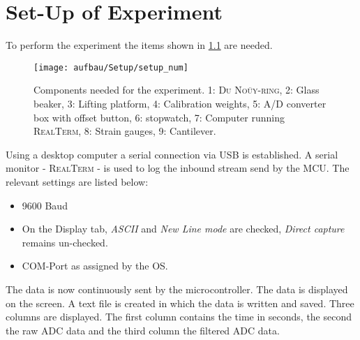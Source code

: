 \chapter{Set-Up of Experiment}
To perform the experiment the items shown in \cref{fig:setup} are needed.
 \begin{figure}[H]
	\centering
	\texttt{[image: aufbau/Setup/setup\_num]}
	\caption[Components needed for the experiment]{Components needed for the experiment. 1: \textsc{Du Noüy-ring}, 2: Glass beaker, 3: Lifting platform, 4: Calibration weights, 5: A/D converter box with offset button, 6: stopwatch, 7: Computer running \textsc{RealTerm}, 8: Strain gauges, 9: Cantilever.}
	\label{fig:setup}
\end{figure}

Using a desktop computer a serial connection via USB is established. A serial monitor - \textsc{RealTerm} - is used to
log the inbound stream send by the MCU. The relevant settings are listed below:
\begin{itemize}
	\item 9600 Baud
	\item On the Display tab, \textit{ASCII} and \textit{New Line mode} are checked, \textit{Direct capture} remains
	un-checked.
	\item COM-Port as assigned by the OS.
\end{itemize}
The data is now continuously sent by the microcontroller. The data is displayed on the screen. A text file is created in
which the data is written and saved. Three columns are displayed. The first column contains the time in seconds, the second
the raw ADC data and the third column the filtered ADC data.\par
